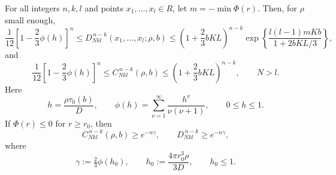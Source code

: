 \documentclass[10pt,a4paper]{amsart}
\begin{document}
\begin{lemma}[6.2]\label{lem:bounds}
    For all integers $n,k,l$ and points $x_1,\ldots,x_l \in R$, let $m = -\min \Phi(r).$
Then, for $\rho$ small enough,
\begin{equation}
\frac{1}{12}\left[1-\frac{2}{3}\phi(h)\right]^n
\le
D^{\,n-k}_{N kl}(x_1,\ldots,x_l;\rho,b)
\le
\left(1+\frac{2}{3}bKL\right)^{n-k}
\exp\!\left\{\frac{l(l-1)mKb}{1+2bKL/3}\right\},
\tag{6.6}\label{6.6}
\end{equation}
and
\begin{equation}
\frac{1}{12}\left[1-\frac{2}{3}\phi(h)\right]^n
\le
C^{\,n-k}_{N kl}(\rho,b)
\le
\left(1+\frac{2}{3}bKL\right)^{n-k},
\qquad N>l .
\tag{6.7}\label{6.7}
\end{equation}
Here
\[
h=\frac{\rho \tau_0(b)}{D},
\qquad
\phi(h)=\sum_{\nu=1}^{\infty}\frac{h^\nu}{\nu(\nu+1)},
\qquad
0\le h\le1 .
\]
If $\Phi(r)\le0$ for $r\ge r_0$, then
\begin{equation}
C^{\,n-k}_{N kl}(\rho,b)\ge e^{-n\gamma},
\qquad
D^{\,n-k}_{N kl}\ge e^{-n\gamma},
\tag{6.8}\label{6.8}
\end{equation}
where
\[
\gamma :=\tfrac23\phi(h_0),
\qquad
h_0:=\frac{4\pi r_0^3\rho}{3D},
\qquad
h_0\le1 .
\]

\end{lemma}
\end{document}
